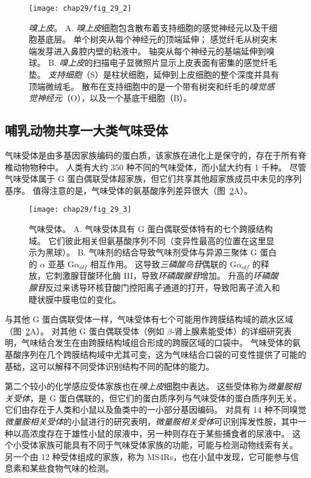 \begin{figure}[htbp]
	\centering
	\texttt{[image: chap29/fig\_29\_2]}
	\caption{\textit{嗅上皮}。
	A. \textit{嗅上皮}细胞包含散布着支持细胞的感觉神经元以及干细胞基底层。
	单个树突从每个神经元的顶端延伸；
	感觉纤毛从树突末端发芽进入鼻腔内壁的粘液中。
	轴突从每个神经元的基端延伸到嗅球。
	B. \textit{嗅上皮}的扫描电子显微照片显示上皮表面有密集的感觉纤毛垫。
	\textit{支持细胞}（S）是柱状细胞，延伸到上皮细胞的整个深度并具有顶端微绒毛。
	散布在支持细胞中的是一个带有树突和纤毛的\textit{嗅觉感觉神经元}（O），以及一个基底干细胞（B）。}
	\label{fig:29_2}
\end{figure}



\subsection{哺乳动物共享一大类气味受体}

气味受体是由多基因家族编码的蛋白质，该家族在进化上是保守的，存在于所有脊椎动物物种中。
人类有大约 350 种不同的气味受体，而小鼠大约有 1 千种。 
尽管气味受体属于 G 蛋白偶联受体超家族，但它们共享其他超家族成员中未见的序列基序。
值得注意的是，气味受体的氨基酸序列差异很大（图~\ref{fig:29_3}A）。


\begin{figure}[htbp]
	\centering
	\texttt{[image: chap29/fig\_29\_3]}
	\caption{气味受体。
		A. 气味受体具有 G 蛋白偶联受体特有的七个跨膜结构域。
		它们彼此相关但氨基酸序列不同（变异性最高的位置在这里显示为黑球）。
		B. 气味剂的结合导致气味剂受体与异源三聚体 G 蛋白的 $ \alpha $ 亚基 G$\alpha_{olf}$ 相互作用。
		这导致\textit{三磷酸鸟苷}偶联的 G$\alpha_{olf}$ 的释放，它刺激腺苷酸环化酶 III，导致\textit{环磷酸腺苷}增加。
		升高的\textit{环磷酸腺苷}反过来诱导环核苷酸门控阳离子通道的打开，导致阳离子流入和睫状膜中膜电位的变化。}
	\label{fig:29_3}
\end{figure}


与其他 G 蛋白偶联受体一样，气味受体有七个可能用作跨膜结构域的疏水区域（图~\ref{fig:29_3}A）。
对其他 G 蛋白偶联受体（例如 $\beta$-肾上腺素能受体）的详细研究表明，气味结合发生在由跨膜结构域组合形成的跨膜区域的口袋中。
气味受体的氨基酸序列在几个跨膜结构域中尤其可变，这为气味结合口袋的可变性提供了可能的基础，这可以解释不同受体识别结构不同的配体的能力。


第二个较小的化学感应受体家族也在\textit{嗅上皮}细胞中表达。
这些受体称为\textit{微量胺相关受体}，是 G 蛋白偶联的，但它们的蛋白质序列与气味受体的蛋白质序列无关。 
它们由存在于人类和小鼠以及鱼类中的一小部分基因编码。
对具有 14 种不同嗅觉\textit{微量胺相关受体}的小鼠进行的研究表明，\textit{微量胺相关受体}可识别挥发性胺，其中一种以高浓度存在于雄性小鼠的尿液中，另一种则存在于某些捕食者的尿液中。
这个小受体家族可能具有不同于气味受体家族的功能，可能与检测动物线索有关。
另一个由 12 种受体组成的家族，称为 MS4Rs，也在小鼠中发现，它可能参与信息素和某些食物气味的检测。



